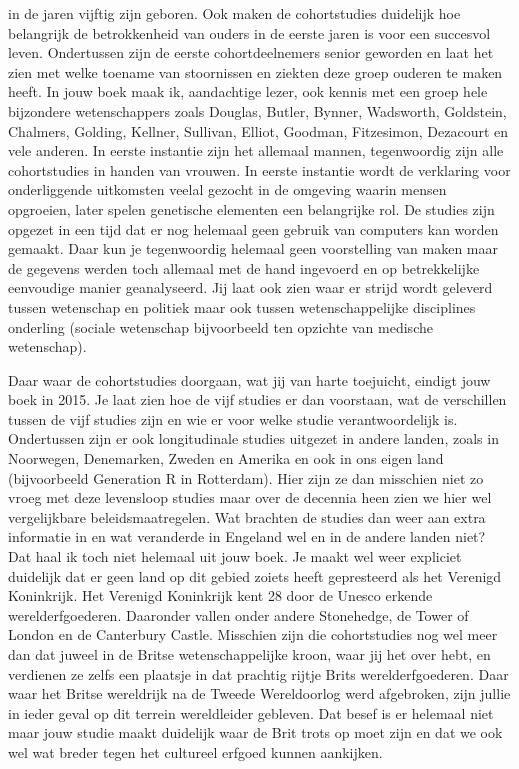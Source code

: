 \documentclass[]{book}
\begin{document}
in de jaren vijftig zijn geboren. Ook maken de cohortstudies duidelijk
hoe belangrijk de betrokkenheid van ouders in de eerste jaren is voor
een succesvol leven. Ondertussen zijn de eerste cohortdeelnemers senior
geworden en laat het zien met welke toename van stoornissen en ziekten
deze groep ouderen te maken heeft. In jouw boek maak ik, aandachtige
lezer, ook kennis met een groep hele bijzondere wetenschappers zoals
Douglas, Butler, Bynner, Wadsworth, Goldstein, Chalmers, Golding,
Kellner, Sullivan, Elliot, Goodman, Fitzesimon, Dezacourt en vele
anderen. In eerste instantie zijn het allemaal mannen, tegenwoordig zijn
alle cohortstudies in handen van vrouwen. In eerste instantie wordt de
verklaring voor onderliggende uitkomsten veelal gezocht in de omgeving
waarin mensen opgroeien, later spelen genetische elementen een
belangrijke rol. De studies zijn opgezet in een tijd dat er nog helemaal
geen gebruik van computers kan worden gemaakt. Daar kun je tegenwoordig
helemaal geen voorstelling van maken maar de gegevens werden toch
allemaal met de hand ingevoerd en op betrekkelijke eenvoudige manier
geanalyseerd. Jij laat ook zien waar er strijd wordt geleverd tussen
wetenschap en politiek maar ook tussen wetenschappelijke disciplines
onderling (sociale wetenschap bijvoorbeeld ten opzichte van medische
wetenschap).

Daar waar de cohortstudies doorgaan, wat jij van harte toejuicht,
eindigt jouw boek in 2015. Je laat zien hoe de vijf studies er dan
voorstaan, wat de verschillen tussen de vijf studies zijn en wie er voor
welke studie verantwoordelijk is. Ondertussen zijn er ook longitudinale
studies uitgezet in andere landen, zoals in Noorwegen, Denemarken,
Zweden en Amerika en ook in ons eigen land (bijvoorbeeld Generation R in
Rotterdam). Hier zijn ze dan misschien niet zo vroeg met deze levensloop
studies maar over de decennia heen zien we hier wel vergelijkbare
beleidsmaatregelen. Wat brachten de studies dan weer aan extra
informatie in en wat veranderde in Engeland wel en in de andere landen
niet? Dat haal ik toch niet helemaal uit jouw boek. Je maakt wel weer
expliciet duidelijk dat er geen land op dit gebied zoiets heeft
gepresteerd als het Verenigd Koninkrijk. Het Verenigd Koninkrijk kent 28
door de Unesco erkende werelderfgoederen. Daaronder vallen onder andere
Stonehedge, de Tower of London en de Canterbury Castle. Misschien zijn
die cohortstudies nog wel meer dan dat juweel in de Britse
wetenschappelijke kroon, waar jij het over hebt, en verdienen ze zelfs
een plaatsje in dat prachtig rijtje Brits werelderfgoederen. Daar waar
het Britse wereldrijk na de Tweede Wereldoorlog werd afgebroken, zijn
jullie in ieder geval op dit terrein wereldleider gebleven. Dat besef is
er helemaal niet maar jouw studie maakt duidelijk waar de Brit trots op
moet zijn en dat we ook wel wat breder tegen het cultureel erfgoed
kunnen aankijken.
\end{document}
